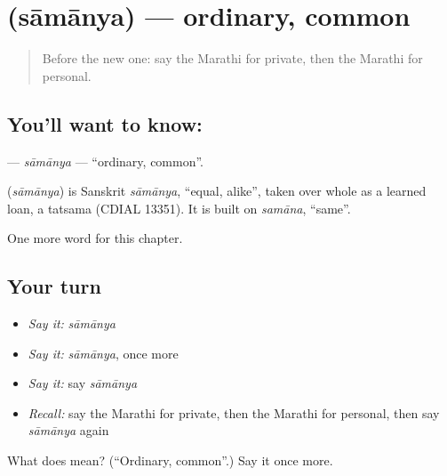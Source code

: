 \section[\texorpdfstring{\mr{सामान्य} (sāmānya)}{सामान्य (sāmānya)}]{ (sāmānya) — ordinary, common}

\label{lesson:MR-C206-samanya}



\begin{quote}
Before the new one: say the Marathi for private, then the Marathi for personal.
\end{quote}

\subsection*{You'll want to know: }
\textbf{} — \emph{sāmānya} — \textquotedblleft{}ordinary, common\textquotedblright{}.

\begin{cousinweb}
\textbf{} (\emph{sāmānya}) is Sanskrit \emph{sāmānya}, \textquotedblleft{}equal, alike\textquotedblright{}, taken over whole as a learned loan, a tatsama (CDIAL 13351). It is built on \emph{samāna}, \textquotedblleft{}same\textquotedblright{}.
\end{cousinweb}

\begin{grammarlens}[title={What you've built}]
One more word for this chapter.
\end{grammarlens}

\subsection*{Your turn}
\begin{itemize}
\raggedright
  \item \emph{Say it:} \emph{sāmānya}
  \item \emph{Say it:} \emph{sāmānya}, once more
  \item \emph{Say it:} say \emph{sāmānya}
  \item \emph{Recall:} say the Marathi for private, then the Marathi for personal, then say \emph{sāmānya} again
\end{itemize}

\begin{tcolorbox}[breakable,colback=teal!4,colframe=teal!35!black,title={Before you move on}]
What does  mean? (\textquotedblleft{}Ordinary, common\textquotedblright{}.) Say it once more.
\end{tcolorbox}

